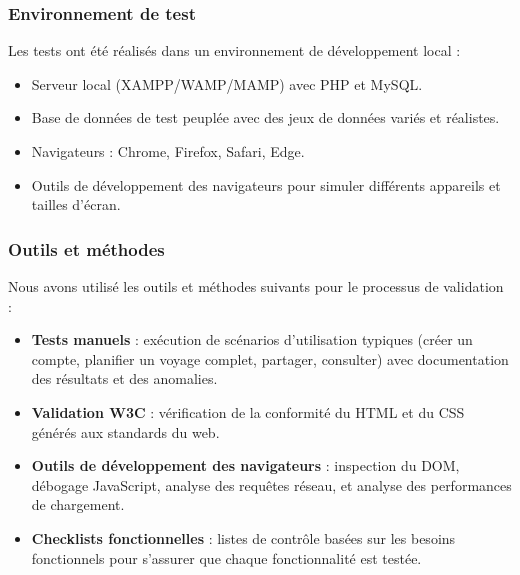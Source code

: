 \documentclass[a4paper,12pt]{article}
\begin{document}
\subsubsection{Environnement de test}
Les tests ont été réalisés dans un environnement de développement local :
\begin{itemize}
  \item Serveur local (XAMPP/WAMP/MAMP) avec PHP et MySQL.
  \item Base de données de test peuplée avec des jeux de données variés et réalistes.
  \item Navigateurs : Chrome, Firefox, Safari, Edge.
  \item Outils de développement des navigateurs pour simuler différents appareils et tailles d'écran.
\end{itemize}

\subsubsection{Outils et méthodes}
Nous avons utilisé les outils et méthodes suivants pour le processus de validation :
\begin{itemize}
  \item \textbf{Tests manuels} : exécution de scénarios d'utilisation typiques (créer un compte, planifier un voyage complet, partager, consulter) avec documentation des résultats et des anomalies.
  \item \textbf{Validation W3C} : vérification de la conformité du HTML et du CSS générés aux standards du web.
  \item \textbf{Outils de développement des navigateurs} : inspection du DOM, débogage JavaScript, analyse des requêtes réseau, et analyse des performances de chargement.
  \item \textbf{Checklists fonctionnelles} : listes de contrôle basées sur les besoins fonctionnels pour s'assurer que chaque fonctionnalité est testée.
\end{itemize}
\end{document}
